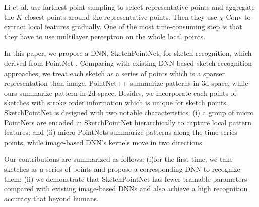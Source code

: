 Li et al. \cite{1801.07791} use farthest point sampling to select representative points and  aggregate the $K$ closest points around the representative points. Then they use $\chi$-Conv to extract local features gradually. One of the most time-consuming step is that they have to use multilayer perceptron on the whole local points.

In this paper, we propose a DNN, SketchPointNet, for sketch recognition, which derived from PointNet \cite{qi2017pointnet}. Comparing with existing DNN-based sketch recognition approaches, we treat each sketch as a series of points which is a sparser representation than image. PointNet++ \cite{qi2017pointnetplusplus} summarize patterns in 3d space, while ours summarize pattern in 2d space. Besides, we incorporate each points of sketches with stroke order information which is unique for sketch points. SketchPointNet is designed with two notable characteristics: (i) a group of micro PointNets are encoded in SketchPointNet hierarchically to capture local pattern features; and (ii) micro PointNets summarize patterns along the time series points, while image-based DNN's kernels move in two directions.

Our contributions are summarized as follows: (i)for the first time, we take sketches as a series of points and propose a corresponding DNN to recognize them; (ii) we demonstrate that SketchPointNet has fewer trainable parameters compared with existing image-based DNNs and also achieve a high recognition accuracy that beyond humans.
